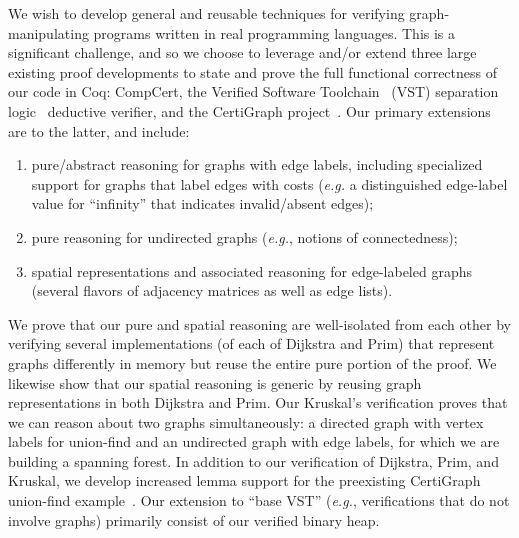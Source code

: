 We wish to develop general and reusable techniques for verifying graph-manipulating programs written in real programming languages.  This is a significant challenge, and so we choose to leverage and/or extend three large existing proof developments to state and prove the full functional correctness of our code in Coq: CompCert, the Verified Software Toolchain~\cite{appel:programlogics} (VST) separation logic~\cite{o2001local} deductive verifier, and the CertiGraph project~\cite{DBLP:journals/pacmpl/WangCMH19}.  Our primary extensions are to the latter, and include:
\begin{enumerate}
\item pure/abstract reasoning for graphs with edge labels, including specialized support for graphs that label edges with costs (\emph{e.g.} a distinguished edge-label value for ``infinity'' that indicates invalid/absent edges);
\item pure reasoning for undirected graphs (\emph{e.g.}, notions of connectedness);
\item spatial representations and associated reasoning for edge-labeled graphs (several flavors of adjacency matrices as well as edge lists).
\end{enumerate}
We prove that our pure and spatial reasoning are well-isolated from each other by verifying several implementations (of each of Dijkstra and Prim) that represent graphs differently in memory but reuse the entire pure portion of the proof.  We likewise show that our spatial reasoning is generic by reusing graph representations in both Dijkstra and Prim.  Our Kruskal's verification proves that we can reason about two graphs simultaneously: a directed graph with vertex labels for union-find and an undirected graph with edge labels, for which we are building a spanning forest.
In addition to our verification of Dijkstra, Prim, and Kruskal, we develop increased lemma support for the preexisting CertiGraph union-find example~\cite{DBLP:journals/pacmpl/WangCMH19}.  Our extension to ``base VST'' (\emph{e.g.}, verifications that do not involve graphs) primarily consist of our verified binary heap.



